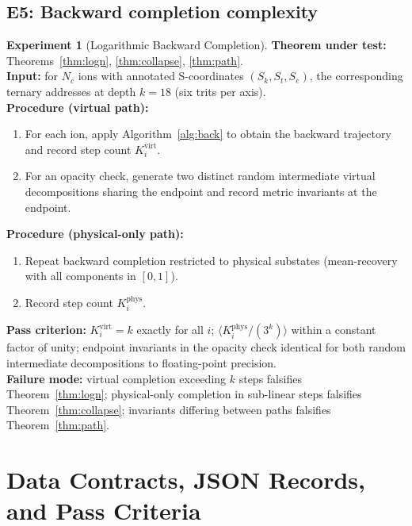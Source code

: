\documentclass[twocolumn,10pt,a4paper]{article}
\theoremstyle{thmstyle}
\theoremstyle{definition}
\newtheorem{experiment}[theorem]{Experiment}
\theoremstyle{remark}
\begin{document}
\subsection{E5: Backward completion complexity}

\begin{experiment}[Logarithmic Backward Completion]
\label{exp:e5}
\textbf{Theorem under test:} Theorems~\ref{thm:logn},
\ref{thm:collapse}, \ref{thm:path}.\\
\textbf{Input:} for $N_{c}$ ions with annotated S-coordinates
$(S_{k},S_{t},S_{e})$, the corresponding ternary addresses at depth
$k=18$ (six trits per axis).\\
\textbf{Procedure (virtual path):}
\begin{enumerate}[nosep,leftmargin=*]
\item For each ion, apply Algorithm~\ref{alg:back} to obtain the
backward trajectory and record step count $K_{i}^{\mathrm{virt}}$.
\item For an opacity check, generate two distinct random
intermediate virtual decompositions sharing the endpoint and
record metric invariants at the endpoint.
\end{enumerate}
\textbf{Procedure (physical-only path):}
\begin{enumerate}[nosep,leftmargin=*]
\item Repeat backward completion restricted to physical
substates (mean-recovery with all components in $[0,1]$).
\item Record step count $K_{i}^{\mathrm{phys}}$.
\end{enumerate}
\textbf{Pass criterion:}
$K_{i}^{\mathrm{virt}}=k$ exactly for all $i$;
$\langle K_{i}^{\mathrm{phys}}/(3^{k})\rangle$ within a constant
factor of unity; endpoint invariants in the opacity check identical
for both random intermediate decompositions to floating-point
precision.\\
\textbf{Failure mode:} virtual completion exceeding $k$ steps
falsifies Theorem~\ref{thm:logn}; physical-only completion in
sub-linear steps falsifies Theorem~\ref{thm:collapse}; invariants
differing between paths falsifies Theorem~\ref{thm:path}.
\end{experiment}

\section{Data Contracts, JSON Records, and Pass Criteria}
\label{sec:contracts}
\end{document}
